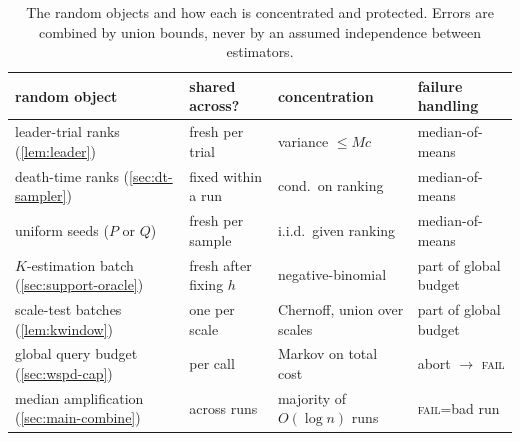 \begin{table}[t]
\centering
\small
\begin{tabular}{llll}
\toprule
random object & shared across? & concentration & failure handling\\
\midrule
leader-trial ranks (\cref{lem:leader}) & fresh per trial & variance $\le Mc$ & median-of-means\\
death-time ranks (\cref{sec:dt-sampler}) & fixed within a run & cond.\ on ranking & median-of-means\\
uniform seeds ($P$ or $Q$) & fresh per sample & i.i.d.\ given ranking & median-of-means\\
$K$-estimation batch (\cref{sec:support-oracle}) & fresh after fixing $h$ & negative-binomial & part of global budget\\
scale-test batches (\cref{lem:kwindow}) & one per scale & Chernoff, union over scales & part of global budget\\
global query budget (\cref{sec:wspd-cap}) & per call & Markov on total cost & abort $\to$ \textsc{fail}\\
median amplification (\cref{sec:main-combine}) & across runs & majority of $O(\log n)$ runs & \textsc{fail}=bad run\\
\bottomrule
\end{tabular}
\caption{The random objects and how each is concentrated and protected. Errors are combined by union
bounds, never by an assumed independence between estimators.}
\label{tab:random}
\end{table}
